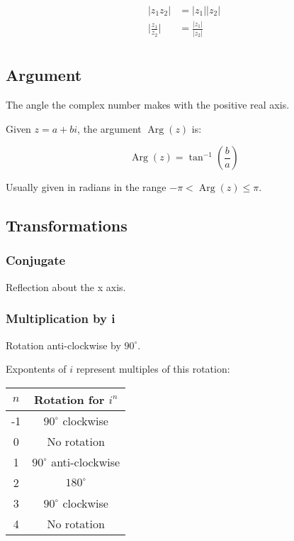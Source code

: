 \documentclass[a4paper,11pt]{article}
\DeclareMathOperator\Arg{Arg}
\begin{document}
$$
\begin{aligned}
\lvert z_1 z_2 \rvert & = \lvert z_1 \rvert \lvert z_2 \rvert \\
\lvert \frac{z_1}{z_2} \rvert & = \frac{\lvert z_1 \rvert}{\lvert z_2 \rvert} \\
\end{aligned}
$$


\subsection{Argument}

The angle the complex number makes with the positive real axis.

Given $z = a + bi$, the argument $\Arg(z)$ is:

$$
\Arg(z) = \tan^{-1}(\frac{b}{a})
$$

Usually given in radians in the range $-\pi < \Arg(z) \leq \pi$.


\subsection{Transformations}

\subsubsection{Conjugate}

Reflection about the x axis.


\subsubsection{Multiplication by i}

Rotation anti-clockwise by $90^\circ$.

Expontents of $i$ represent multiples of this rotation:

\begin{center}
\begin{tabular}{c|c}
$n$ & Rotation for $i^n$ \\
\hline
-1 & $90^\circ$ clockwise \\
0 & No rotation \\
1 & $90^\circ$ anti-clockwise \\
2 & $180^\circ$ \\
3 & $90^\circ$ clockwise \\
4 & No rotation \\
\end{tabular}
\end{center}
\end{document}
